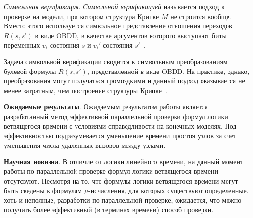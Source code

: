 \documentclass[a4paper,notitlepage,14pt]{article}
\begin{document}
\textit{Символьная верификация}. \emph{Символьной верификацией} называется подход к
проверке на модели, при котором структура Крипке $M$ не строится вообще. Вместо этого
используется символьное представление отношения переходов $R(s, s')$ в виде OBDD, в
качестве аргументов которого выступают биты переменных $v_i$ состояния $s$ и $v_i'$
состояния $s'$~\cite{Clarke}.

Задача символьной верификации сводится к символьным преобразованиям булевой формулы $R(s,
s')$, представленной в виде OBDD. На практике, однако, преобразования могут получаться
громоздкими и данный подход оказывается не менее затратным, чем построение структуры
Крипке~\cite{Stern97parallelizingthe}.


\textbf{Ожидаемые результаты}. Ожидаемым результатом работы является разработанный метод
эффективной параллельной проверки формул логики ветвящегося времени с условиями
справедливости на конечных моделях. Под эффективностью подразумевается уменьшение времени
простоя узлов за счет уменьшения числа удаленных вызовов между узлами.

\textbf{Научная новизна}. В отличие от логики линейного времени, на данный момент работы
по параллельной проверке формул логики ветвящегося времени отсутсвуют. Несмотря на то, что
формулы логики ветвящегося времени могут быть сведены к формулам $\mu$-исчисления, для
которых существуют определенные, хоть и неполные, разработки по параллельной проверке,
ожидается, что можно получить более эффективный (в терминах времени) способ проверки.



\end{document}
